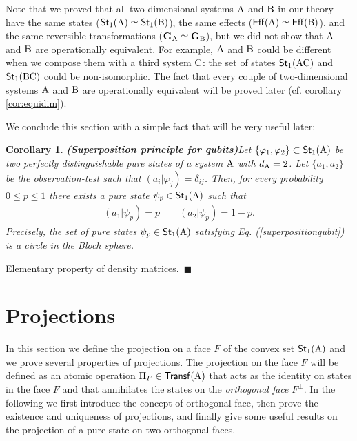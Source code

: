 \documentclass[12pt,aps,pra,showpacs,groupedaddress]{revtex4-1}
\newtheorem{corollary}{Corollary} \newtheorem{theorem}{Theorem}
\def\Proof{\medskip\par\noindent{\bf Proof. }}
\def\qed{$\,\blacksquare$\par}
\def\rB{{\rm B}}
\def\rC{{\rm C}}
\def\Cntset{{\mathsf{Eff}}}
\def\Stset{{\mathsf{St}}}
\def\Trnset{{\mathsf{Transf}}}
\def\grp#1{{\mathbf{#1}}} \def\Span{\mathsf{Span}}
\def\SC#1#2{\left(#1\right|\left.\!#2\right)}  \def\Tr{{\rm Tr}}
\begin{document}
Note that we proved that all two-dimensional systems ${\rm A}$ and $\rB$ in our theory have the same
states ($\Stset_1 (\rA) \simeq \Stset_1 (\rB)$), the same effects ($\Cntset(\rA) \simeq \Cntset(\rB)$),
and the same reversible transformations ($\grp G_\rA \simeq \grp G_\rB$), but we did not show that ${\rm A}$ and
$\rB$ are operationally equivalent.  For example, ${\rm A}$ and $\rB$ could be different when we compose
them with a third system $\rC$: the set of states $\Stset_1(\rA\rC)$ and $\Stset_1 (\rB\rC)$ could
be non-isomorphic.  The fact that every couple of two-dimensional systems ${\rm A}$ and $\rB$ are operationally equivalent will be proved later (cf. corollary \ref{cor:equidim}).


We conclude this section with a simple fact that will be very useful later:

\begin{corollary}{\bf (Superposition principle for qubits)}\label{cor:superpositionqubit}
  Let $\{\varphi_1, \varphi_2\} \subset \Stset_1(\rA)$ be two perfectly distinguishable pure states
  of a system ${\rm A}$ with $d_{\rm A} =2$. Let $\{a_1, a_2\}$ be the observation-test such that $\SC
  {a_i}{\varphi_j}= \delta_{ij}$.  Then, for every probability $0\le p \le 1$ there exists a pure state
  $\psi_p \in\Stset_1(\rA)$ such that
\begin{align}\label{superpositionqubit}
\SC {a_1}{\psi_p}  = p  \qquad \SC {a_2 }{\psi_p}  = 1-p.
\end{align}
Precisely, the set of pure states $\psi_p \in\Stset_1 (\rA)$ satisfying Eq. (\ref{superpositionqubit}) is
a circle in the Bloch sphere.
\end{corollary}
\Proof Elementary property of density matrices.  \qed



\section{Projections}\label{sec:projections}

In this section we define the projection on a face $F$ of the convex set $\Stset_1 (\rA)$ and we
prove several properties of projections.  The projection on the face $F$ will be defined as an
atomic operation $\Pi_F\in\Trnset(\rA)$ that acts as the identity on states in the face $F$ and that
annihilates the states on the \emph{orthogonal face} $F^\perp$.  In the following we first introduce
the concept of orthogonal face, then prove the existence and uniqueness of projections, and finally give some
useful results on the projection of a pure state on two orthogonal faces.
\end{document}
